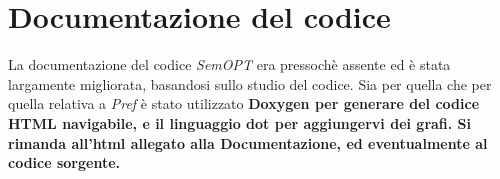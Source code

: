 \section{Documentazione del codice}
La documentazione del codice \emph{SemOPT} era pressochè assente ed è stata
largamente migliorata, basandosi sullo studio del codice.
Sia per quella che per quella relativa a \emph{Pref} è stato utilizzato
\bfseries{Doxygen} per generare del codice HTML navigabile, e il linguaggio
\bfseries{dot} per aggiungervi dei grafi. Si rimanda all'html allegato alla
Documentazione, ed eventualmente al codice sorgente.
